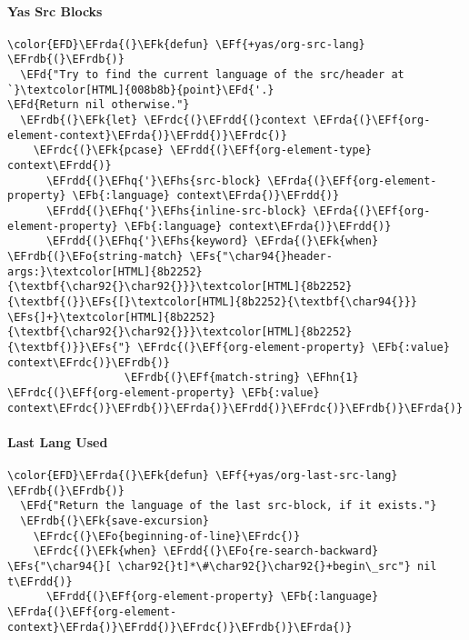 \documentclass{article}
\newcommand{\EFs}[1]{\textcolor{EFs}{#1}} %
\newcommand{\EFd}[1]{\textcolor{EFd}{#1}} %
\newcommand{\EFk}[1]{\textcolor{EFk}{#1}} %
\newcommand{\EFb}[1]{\textcolor{EFb}{#1}} %
\newcommand{\EFf}[1]{\textcolor{EFf}{#1}} %
\newcommand{\EFo}[1]{\textcolor{EFo}{#1}} %
\newcommand{\EFhn}[1]{\textcolor{EFhn}{\textbf{#1}}} %
\newcommand{\EFhq}[1]{#1} %
\newcommand{\EFhs}[1]{\textcolor{EFhs}{#1}} %
\newcommand{\EFrda}[1]{\textcolor{EFrda}{#1}} %
\newcommand{\EFrdb}[1]{\textcolor{EFrdb}{#1}} %
\newcommand{\EFrdc}[1]{\textcolor{EFrdc}{#1}} %
\newcommand{\EFrdd}[1]{\textcolor{EFrdd}{#1}} %
\begin{document}
\paragraph{Yas Src Blocks}
\label{sec:orgf46b981}
\begin{Code}
\begin{Verbatim}
\color{EFD}\EFrda{(}\EFk{defun} \EFf{+yas/org-src-lang} \EFrdb{(}\EFrdb{)}
  \EFd{"Try to find the current language of the src/header at `}\textcolor[HTML]{008b8b}{point}\EFd{'.}
\EFd{Return nil otherwise."}
  \EFrdb{(}\EFk{let} \EFrdc{(}\EFrdd{(}context \EFrda{(}\EFf{org-element-context}\EFrda{)}\EFrdd{)}\EFrdc{)}
    \EFrdc{(}\EFk{pcase} \EFrdd{(}\EFf{org-element-type} context\EFrdd{)}
      \EFrdd{(}\EFhq{'}\EFhs{src-block} \EFrda{(}\EFf{org-element-property} \EFb{:language} context\EFrda{)}\EFrdd{)}
      \EFrdd{(}\EFhq{'}\EFhs{inline-src-block} \EFrda{(}\EFf{org-element-property} \EFb{:language} context\EFrda{)}\EFrdd{)}
      \EFrdd{(}\EFhq{'}\EFhs{keyword} \EFrda{(}\EFk{when} \EFrdb{(}\EFo{string-match} \EFs{"\char94{}header-args:}\textcolor[HTML]{8b2252}{\textbf{\char92{}\char92{}}}\textcolor[HTML]{8b2252}{\textbf{(}}\EFs{[}\textcolor[HTML]{8b2252}{\textbf{\char94{}}} \EFs{]+}\textcolor[HTML]{8b2252}{\textbf{\char92{}\char92{}}}\textcolor[HTML]{8b2252}{\textbf{)}}\EFs{"} \EFrdc{(}\EFf{org-element-property} \EFb{:value} context\EFrdc{)}\EFrdb{)}
                  \EFrdb{(}\EFf{match-string} \EFhn{1} \EFrdc{(}\EFf{org-element-property} \EFb{:value} context\EFrdc{)}\EFrdb{)}\EFrda{)}\EFrdd{)}\EFrdc{)}\EFrdb{)}\EFrda{)}
\end{Verbatim}
\end{Code}

\paragraph{Last Lang Used}
\label{sec:org485cdac}
\begin{Code}
\begin{Verbatim}
\color{EFD}\EFrda{(}\EFk{defun} \EFf{+yas/org-last-src-lang} \EFrdb{(}\EFrdb{)}
  \EFd{"Return the language of the last src-block, if it exists."}
  \EFrdb{(}\EFk{save-excursion}
    \EFrdc{(}\EFo{beginning-of-line}\EFrdc{)}
    \EFrdc{(}\EFk{when} \EFrdd{(}\EFo{re-search-backward} \EFs{"\char94{}[ \char92{}t]*\#\char92{}\char92{}+begin\_src"} nil t\EFrdd{)}
      \EFrdd{(}\EFf{org-element-property} \EFb{:language} \EFrda{(}\EFf{org-element-context}\EFrda{)}\EFrdd{)}\EFrdc{)}\EFrdb{)}\EFrda{)}
\end{Verbatim}
\end{Code}
\end{document}
